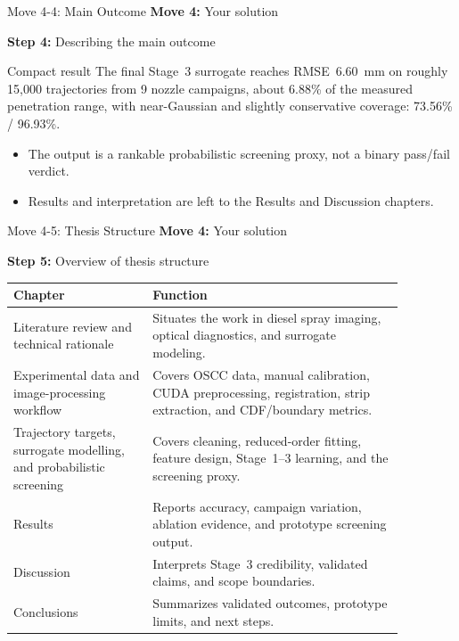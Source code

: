 \documentclass[aspectratio=169,11pt]{beamer}
\newcommand{\movetag}[2]{\textbf{Move #1:} #2}
\newcommand{\steptag}[2]{\textbf{Step #1:} #2}
\begin{document}
\begin{frame}{Move 4-4: Main Outcome}
\footnotesize
\movetag{4}{Your solution}

\vspace{0.5em}
\steptag{4}{Describing the main outcome}

\vspace{0.5em}
\begin{block}{Compact result}
The final Stage~3 surrogate reaches RMSE~\SI{6.60}{mm} on roughly 15{,}000 trajectories from 9 nozzle campaigns, about 6.88\% of the measured penetration range, with near-Gaussian and slightly conservative coverage: 73.56\% / 96.93\%.
\end{block}

\vspace{0.4em}
\begin{itemize}
  \item The output is a rankable probabilistic screening proxy, not a binary pass/fail verdict.
  \item Results and interpretation are left to the Results and Discussion chapters.
\end{itemize}
\end{frame}

\begin{frame}{Move 4-5: Thesis Structure}
\scriptsize
\movetag{4}{Your solution}

\vspace{0.5em}
\steptag{5}{Overview of thesis structure}

\vspace{0.6em}
\begin{tabular}{L{0.31\linewidth}L{0.56\linewidth}}
\toprule
Chapter & Function \\
\midrule
Literature review and technical rationale & Situates the work in diesel spray imaging, optical diagnostics, and surrogate modeling. \\
Experimental data and image-processing workflow & Covers OSCC data, manual calibration, CUDA preprocessing, registration, strip extraction, and CDF/boundary metrics. \\
Trajectory targets, surrogate modelling, and probabilistic screening & Covers cleaning, reduced-order fitting, feature design, Stage~1--3 learning, and the screening proxy. \\
Results & Reports accuracy, campaign variation, ablation evidence, and prototype screening output. \\
Discussion & Interprets Stage~3 credibility, validated claims, and scope boundaries. \\
Conclusions & Summarizes validated outcomes, prototype limits, and next steps. \\
\bottomrule
\end{tabular}
\end{frame}
\end{document}
